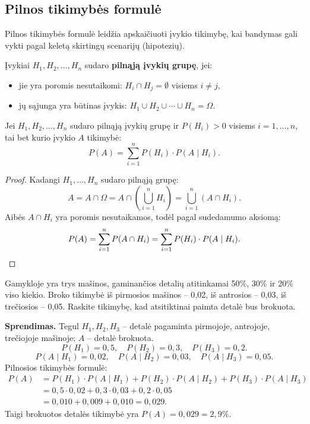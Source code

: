 \subsection{Pilnos tikimybės formulė}

Pilnos tikimybės formulė leidžia apskaičiuoti įvykio tikimybę, kai bandymas gali vykti pagal keletą skirtingų scenarijų (hipotezių).

\begin{definition}
Įvykiai $H_1, H_2, \ldots, H_n$ sudaro \textbf{pilnąją įvykių grupę}, jei:
\begin{itemize}
    \item jie yra poromis nesutaikomi: $H_i \cap H_j = \emptyset$ visiems $i \neq j$,
    \item jų sąjunga yra būtinas įvykis: $H_1 \cup H_2 \cup \cdots \cup H_n = \Omega$.
\end{itemize}
\end{definition}

\begin{theorem}
Jei $H_1, H_2, \ldots, H_n$ sudaro pilnąją įvykių grupę ir $P(H_i) > 0$ visiems $i = 1, \ldots, n$, tai bet kurio įvykio $A$ tikimybė:
\[
P(A) = \sum_{i=1}^{n} P(H_i) \cdot P(A \mid H_i).
\]
\end{theorem}

\begin{proof}
Kadangi $H_1, \ldots, H_n$ sudaro pilnąją grupę:
\[
A = A \cap \Omega = A \cap \left(\bigcup_{i=1}^{n} H_i\right) = \bigcup_{i=1}^{n} (A \cap H_i).
\]
Aibės $A \cap H_i$ yra poromis nesutaikamos, todėl pagal sudedamumo aksiomą:
\[
P(A) = \sum_{i=1}^{n} P(A \cap H_i) = \sum_{i=1}^{n} P(H_i) \cdot P(A \mid H_i). \qedhere
\]
\end{proof}

\begin{example}
Gamykloje yra trys mašinos, gaminančios detalių atitinkamai 50\%, 30\% ir 20\% viso kiekio. Broko tikimybė iš pirmosios mašinos – 0{,}02, iš antrosios – 0{,}03, iš trečiosios – 0{,}05. Raskite tikimybę, kad atsitiktinai paimta detalė bus brokuota.

\textbf{Sprendimas.} Tegul $H_1, H_2, H_3$ – detalė pagaminta pirmojoje, antrojoje, trečiojoje mašinoje; $A$ – detalė brokuota.
\[
P(H_1) = 0{,}5,\quad P(H_2) = 0{,}3,\quad P(H_3) = 0{,}2.
\]
\[
P(A \mid H_1) = 0{,}02,\quad P(A \mid H_2) = 0{,}03,\quad P(A \mid H_3) = 0{,}05.
\]
Pilnosios tikimybės formulė:
\begin{align*}
P(A) &= P(H_1) \cdot P(A \mid H_1) + P(H_2) \cdot P(A \mid H_2) + P(H_3) \cdot P(A \mid H_3) \\
&= 0{,}5 \cdot 0{,}02 + 0{,}3 \cdot 0{,}03 + 0{,}2 \cdot 0{,}05 \\
&= 0{,}010 + 0{,}009 + 0{,}010 = 0{,}029.
\end{align*}
Taigi brokuotos detalės tikimybė yra $P(A) = 0{,}029 = 2{,}9\%$.
\end{example}

